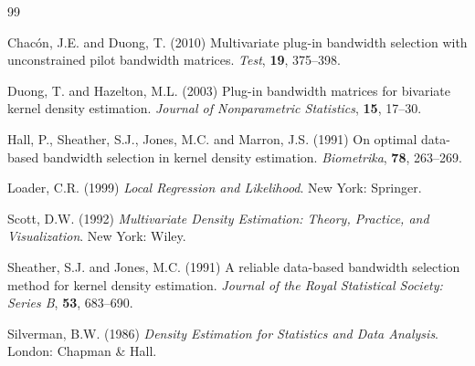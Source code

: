 \documentclass[numsec,webpdf,modern,medium,namedate]{oup-authoring-template}
\theoremstyle{thmstyleone}
\theoremstyle{thmstyletwo}
\theoremstyle{thmstylethree}
\begin{document}
\begin{thebibliography}{99}

Chac\'on, J.E. and Duong, T. (2010) Multivariate plug-in bandwidth selection with unconstrained pilot bandwidth matrices. \textit{Test}, \textbf{19}, 375--398.

Duong, T. and Hazelton, M.L. (2003) Plug-in bandwidth matrices for bivariate kernel density estimation. \textit{Journal of Nonparametric Statistics}, \textbf{15}, 17--30.

Hall, P., Sheather, S.J., Jones, M.C. and Marron, J.S. (1991) On optimal data-based bandwidth selection in kernel density estimation. \textit{Biometrika}, \textbf{78}, 263--269.

Loader, C.R. (1999) \textit{Local Regression and Likelihood}. New York: Springer.

Scott, D.W. (1992) \textit{Multivariate Density Estimation: Theory, Practice, and Visualization}. New York: Wiley.

Sheather, S.J. and Jones, M.C. (1991) A reliable data-based bandwidth selection method for kernel density estimation. \textit{Journal of the Royal Statistical Society: Series B}, \textbf{53}, 683--690.

Silverman, B.W. (1986) \textit{Density Estimation for Statistics and Data Analysis}. London: Chapman \& Hall.

\end{thebibliography}
\end{document}

